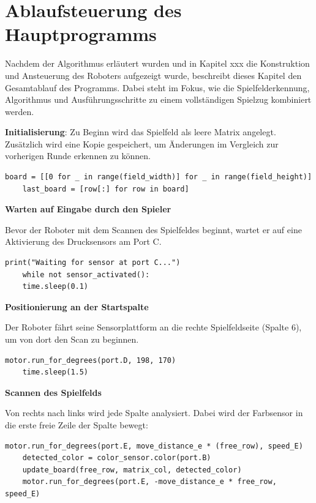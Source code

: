 \section{Ablaufsteuerung des Hauptprogramms}

Nachdem der Algorithmus erläutert wurden und in Kapitel xxx die Konstruktion und Ansteuerung des Roboters aufgezeigt wurde, beschreibt dieses Kapitel den Gesamtablauf des Programms. Dabei steht im Fokus, wie die Spielfelderkennung, Algorithmus und Ausführungsschritte zu einem vollständigen Spielzug kombiniert werden.

\textbf{Initialisierung}:
Zu Beginn wird das Spielfeld als leere Matrix angelegt. Zusätzlich wird eine Kopie gespeichert, um Änderungen im Vergleich zur vorherigen Runde erkennen zu können.

\begin{lstlisting}[style=pythonstyle]
	board = [[0 for _ in range(field_width)] for _ in range(field_height)]
	last_board = [row[:] for row in board]
\end{lstlisting}

\textbf{Warten auf Eingabe durch den Spieler}

Bevor der Roboter mit dem Scannen des Spielfeldes beginnt, wartet er auf eine Aktivierung des Drucksensors am Port C.

\begin{lstlisting}[style=pythonstyle]
	print("Waiting for sensor at port C...")
	while not sensor_activated():
	time.sleep(0.1)
\end{lstlisting}

\textbf{Positionierung an der Startspalte}

Der Roboter fährt seine Sensorplattform an die rechte Spielfeldseite (Spalte 6), um von dort den Scan zu beginnen.

\begin{lstlisting}[style=pythonstyle]
	motor.run_for_degrees(port.D, 198, 170)
	time.sleep(1.5)
\end{lstlisting}

\textbf{Scannen des Spielfelds}

Von rechts nach links wird jede Spalte analysiert. Dabei wird der Farbsensor in die erste freie Zeile der Spalte bewegt:

\begin{lstlisting}[style=pythonstyle]
	motor.run_for_degrees(port.E, move_distance_e * (free_row), speed_E)
	detected_color = color_sensor.color(port.B)
	update_board(free_row, matrix_col, detected_color)
	motor.run_for_degrees(port.E, -move_distance_e * free_row, speed_E)
\end{lstlisting}

